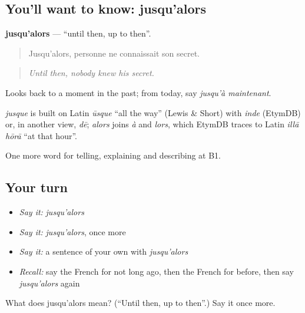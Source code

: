 \subsection*{You'll want to know: jusqu'alors}
\textbf{jusqu'alors} — \textquotedblleft{}until then, up to then\textquotedblright{}.

\begin{quote}
Jusqu'alors, personne ne connaissait son secret.
\end{quote}

\begin{quote}
\emph{Until then, nobody knew his secret.}
\end{quote}

Looks back to a moment in the past; from today, say \emph{jusqu'à maintenant}.

\begin{cousinweb}
\emph{jusque} is built on Latin \emph{ūsque} \textquotedblleft{}all the way\textquotedblright{} (Lewis \& Short) with \emph{inde} (EtymDB) or, in another view, \emph{dē}; \emph{alors} joins \emph{à} and \emph{lors}, which EtymDB traces to Latin \emph{illā hōrā} \textquotedblleft{}at that hour\textquotedblright{}.
\end{cousinweb}

\begin{grammarlens}[title={What you've built}]
One more word for telling, explaining and describing at B1.
\end{grammarlens}

\subsection*{Your turn}
\begin{itemize}
\raggedright
  \item \emph{Say it:} \emph{jusqu'alors}
  \item \emph{Say it:} \emph{jusqu'alors}, once more
  \item \emph{Say it:} a sentence of your own with \emph{jusqu'alors}
  \item \emph{Recall:} say the French for not long ago, then the French for before, then say \emph{jusqu'alors} again
\end{itemize}

\begin{tcolorbox}[breakable,colback=teal!4,colframe=teal!35!black,title={Before you move on}]
What does jusqu'alors mean? (\textquotedblleft{}Until then, up to then\textquotedblright{}.) Say it once more.
\end{tcolorbox}
